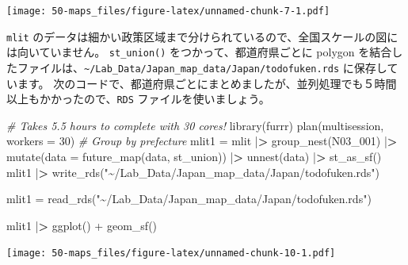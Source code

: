 \documentclass[
]{book}
\newenvironment{Shaded}{\begin{snugshade}}{\end{snugshade}}
\newcommand{\AttributeTok}[1]{\textcolor[rgb]{0.77,0.63,0.00}{#1}}
\newcommand{\CommentTok}[1]{\textcolor[rgb]{0.56,0.35,0.01}{\textit{#1}}}
\newcommand{\DecValTok}[1]{\textcolor[rgb]{0.00,0.00,0.81}{#1}}
\newcommand{\ErrorTok}[1]{\textcolor[rgb]{0.64,0.00,0.00}{\textbf{#1}}}
\newcommand{\FunctionTok}[1]{\textcolor[rgb]{0.00,0.00,0.00}{#1}}
\newcommand{\NormalTok}[1]{#1}
\newcommand{\OtherTok}[1]{\textcolor[rgb]{0.56,0.35,0.01}{#1}}
\newcommand{\SpecialCharTok}[1]{\textcolor[rgb]{0.00,0.00,0.00}{#1}}
\newcommand{\StringTok}[1]{\textcolor[rgb]{0.31,0.60,0.02}{#1}}
\theoremstyle{definition}
\theoremstyle{definition}
\theoremstyle{definition}
\theoremstyle{definition}
\theoremstyle{remark}
\begin{document}
\texttt{[image: 50-maps\_files/figure-latex/unnamed-chunk-7-1.pdf]}

\texttt{mlit} のデータは細かい政策区域まで分けられているので、全国スケールの図には向いていません。
\texttt{st\_union()} をつかって、都道府県ごとに polygon を結合したファイルは、\texttt{\textasciitilde{}/Lab\_Data/Japan\_map\_data/Japan/todofuken.rds} に保存しています。
次のコードで、都道府県ごとにまとめましたが、並列処理でも５時間以上もかかったので、\texttt{RDS} ファイルを使いましょう。

\begin{Shaded}
\begin{Highlighting}[]
\CommentTok{\# Takes 5.5 hours to complete with 30 cores!}
\FunctionTok{library}\NormalTok{(furrr)}
\FunctionTok{plan}\NormalTok{(multisession, }\AttributeTok{workers =} \DecValTok{30}\NormalTok{)}
\CommentTok{\# Group by prefecture}
\NormalTok{mlit1 }\OtherTok{=}\NormalTok{ mlit }\SpecialCharTok{|}\ErrorTok{\textgreater{}} \FunctionTok{group\_nest}\NormalTok{(N03\_001) }\SpecialCharTok{|}\ErrorTok{\textgreater{}} 
  \FunctionTok{mutate}\NormalTok{(}\AttributeTok{data =} \FunctionTok{future\_map}\NormalTok{(data, st\_union)) }\SpecialCharTok{|}\ErrorTok{\textgreater{}} 
  \FunctionTok{unnest}\NormalTok{(data) }\SpecialCharTok{|}\ErrorTok{\textgreater{}} \FunctionTok{st\_as\_sf}\NormalTok{() }
\NormalTok{mlit1 }\SpecialCharTok{|}\ErrorTok{\textgreater{}} \FunctionTok{write\_rds}\NormalTok{(}\StringTok{"\textasciitilde{}/Lab\_Data/Japan\_map\_data/Japan/todofuken.rds"}\NormalTok{)}
\end{Highlighting}
\end{Shaded}

\begin{Shaded}
\begin{Highlighting}[]
\NormalTok{mlit1 }\OtherTok{=} \FunctionTok{read\_rds}\NormalTok{(}\StringTok{"\textasciitilde{}/Lab\_Data/Japan\_map\_data/Japan/todofuken.rds"}\NormalTok{)}
\end{Highlighting}
\end{Shaded}

\begin{Shaded}
\begin{Highlighting}[]
\NormalTok{mlit1 }\SpecialCharTok{|}\ErrorTok{\textgreater{}} \FunctionTok{ggplot}\NormalTok{() }\SpecialCharTok{+} \FunctionTok{geom\_sf}\NormalTok{()}
\end{Highlighting}
\end{Shaded}

\texttt{[image: 50-maps\_files/figure-latex/unnamed-chunk-10-1.pdf]}
\end{document}
